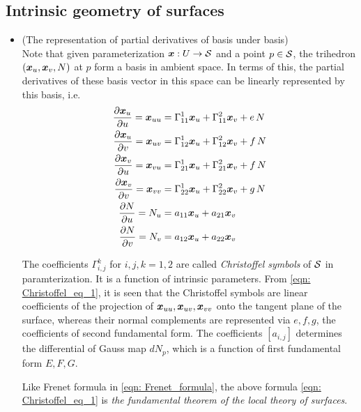 \documentclass[11pt]{article}
\begin{document}
\subsection{Intrinsic geometry of surfaces}
\begin{itemize}
\item (The representation of partial derivatives of basis under basis)\\
Note that given parameterization $\boldsymbol{x}: U \rightarrow {\mathcal S}$ and a point $p\in {\mathcal S}$, the trihedron $(\boldsymbol{x}_{u}, \boldsymbol{x}_{v}, N)$ at $p$ form a basis in ambient space. In terms of this, the partial derivatives of these basis vector in this space can be linearly represented by this basis, i.e. 
\begin{align}
\frac{\partial \boldsymbol{x}_{u}}{ \partial u} = \boldsymbol{x}_{uu} &= \Gamma_{11}^{1}\boldsymbol{x}_{u} +  \Gamma_{11}^{2}\boldsymbol{x}_{v} + e\,N\nonumber\\
\frac{\partial \boldsymbol{x}_{u}}{ \partial v} = \boldsymbol{x}_{uv} &= \Gamma_{12}^{1}\boldsymbol{x}_{u} +  \Gamma_{12}^{2}\boldsymbol{x}_{v} + f\,N\nonumber\\
\frac{\partial \boldsymbol{x}_{v}}{ \partial u} = \boldsymbol{x}_{vu} &= \Gamma_{21}^{1}\boldsymbol{x}_{u} +  \Gamma_{21}^{2}\boldsymbol{x}_{v} + f\,N\nonumber\\
\frac{\partial \boldsymbol{x}_{v}}{ \partial v} = \boldsymbol{x}_{vv} &= \Gamma_{22}^{1}\boldsymbol{x}_{u} +  \Gamma_{22}^{2}\boldsymbol{x}_{v} + g\,N\nonumber\\
\frac{\partial N}{ \partial u} =N_{u} &= a_{11}\boldsymbol{x}_{u} +  a_{21}\boldsymbol{x}_{v} \nonumber\\
\frac{\partial N}{ \partial v} =N_{v} &= a_{12}\boldsymbol{x}_{u} +  a_{22}\boldsymbol{x}_{v} \label{eqn: Christoffel_eq_1}
\end{align}

The coefficients $\Gamma_{i,j}^{k}$ for $i,j,k = 1,2$ are called \emph{Christoffel symbols} of ${\mathcal S}$ in paramterization. It is  a function of intrinsic parameters. From \eqref{eqn: Christoffel_eq_1}, it is seen that the Christoffel symbols are linear coefficients of the projection of $\boldsymbol{x}_{uu}, \boldsymbol{x}_{uv}, \boldsymbol{x}_{vv}$ onto the tangent plane of the surface, whereas their normal complements are represented via $e,f,g$, the coefficients of second fundamental form. The coefficients $[a_{i,j}]$ determines the differential of Gauss map $dN_{p}$, which is a function of first fundamental form $E,F,G$. 

Like Frenet formula in \eqref{eqn: Frenet_formula}, the above formula \eqref{eqn: Christoffel_eq_1} is \emph{the fundamental theorem of the local theory of surfaces}. 




\end{itemize}
\end{document}

